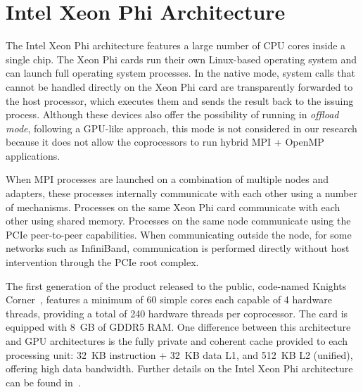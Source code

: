 \section{Intel Xeon Phi Architecture}\label{sec:back-manycore}

The Intel Xeon Phi architecture features a large number of CPU cores
inside a single chip.  The Xeon Phi cards run their own Linux-based
operating system and can launch full operating system processes.  In
the native mode, system calls that cannot be handled directly on the
Xeon Phi card are transparently forwarded to the host processor, which
executes them and sends the result back to the issuing process.
Although these devices also offer the possibility of running in
\emph{offload mode}, following a GPU-like approach, this mode is not
considered in our research because it does not allow the coprocessors
to run hybrid MPI + OpenMP applications.

When MPI processes are launched on a combination of multiple nodes and
adapters, these processes internally communicate with each other using
a number of mechanisms.  Processes on the same Xeon Phi card
communicate with each other using shared memory.  Processes on the
same node communicate using the PCIe peer-to-peer capabilities.  When
communicating outside the node, for some networks such as InfiniBand,
communication is performed directly without host intervention through
the PCIe root complex.

The first generation of the product released to the public, code-named
Knights Corner~\cite{knc}, features a minimum of 60 simple cores each
capable of 4 hardware threads, providing a total of 240 hardware
threads per coprocessor.  The card is equipped with 8~GB of GDDR5 RAM.
One difference between this architecture and GPU architectures is the
fully private and coherent cache provided to each processing unit:
32~KB instruction + 32~KB data L1, and 512~KB L2 (unified), offering
high data bandwidth.  Further details on the Intel Xeon Phi
architecture can be found in~\cite{mic,knc}.



